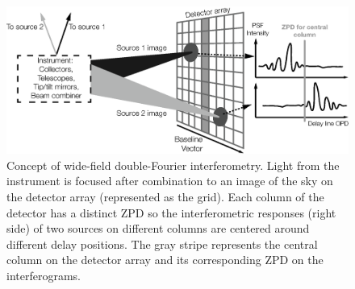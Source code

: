 \begin{figure}[ht!]
\begin{center}
\includegraphics[width=\textwidth]{Figures/f1.eps}
\caption[WideField]{Concept of wide-field double-Fourier interferometry. Light from the instrument is focused after combination to an image of the sky on the detector array (represented as the grid). Each column of the detector has a distinct ZPD so the interferometric responses (right side) of two sources on different columns are centered around different delay positions. The gray stripe represents the central column on the detector array and its corresponding ZPD on the interferograms.}
\label{fig:widefield}
\end{center}
\end{figure}

